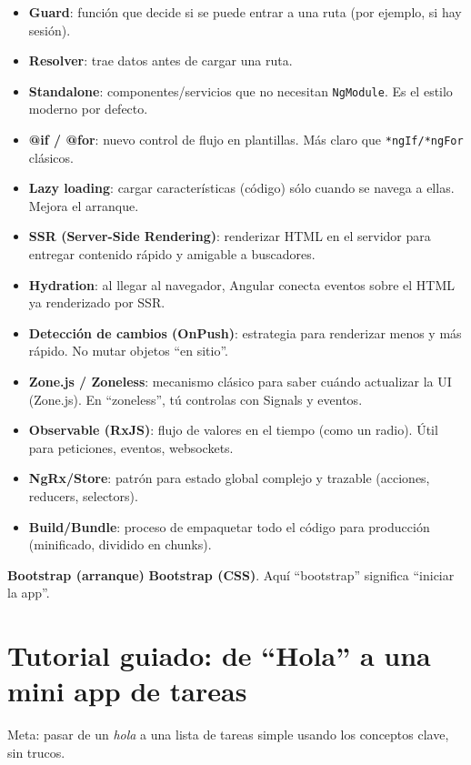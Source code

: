 \documentclass[11pt,a4paper]{article}
\begin{document}
\begin{itemize}[leftmargin=*]
  \item \textbf{Guard}: función que decide si se puede entrar a una ruta (por ejemplo, si hay sesión).
  \item \textbf{Resolver}: trae datos antes de cargar una ruta.
  \item \textbf{Standalone}: componentes/servicios que no necesitan \texttt{NgModule}. Es el estilo moderno por defecto.
  \item \textbf{@if / @for}: nuevo control de flujo en plantillas. Más claro que \texttt{*ngIf/*ngFor} clásicos.
  \item \textbf{Lazy loading}: cargar características (código) sólo cuando se navega a ellas. Mejora el arranque.
  \item \textbf{SSR (Server-Side Rendering)}: renderizar HTML en el servidor para entregar contenido rápido y amigable a buscadores.
  \item \textbf{Hydration}: al llegar al navegador, Angular conecta eventos sobre el HTML ya renderizado por SSR.
  \item \textbf{Detección de cambios (OnPush)}: estrategia para renderizar menos y más rápido. No mutar objetos “en sitio”.
  \item \textbf{Zone.js / Zoneless}: mecanismo clásico para saber cuándo actualizar la UI (Zone.js). En “zoneless”, tú controlas con Signals y eventos.
  \item \textbf{Observable (RxJS)}: flujo de valores en el tiempo (como un radio). Útil para peticiones, eventos, websockets.
  \item \textbf{NgRx/Store}: patrón para estado global complejo y trazable (acciones, reducers, selectors).
  \item \textbf{Build/Bundle}: proceso de empaquetar todo el código para producción (minificado, dividido en chunks).
\end{itemize}

\begin{warnbox}
\textbf{Bootstrap (arranque)} \neq \textbf{Bootstrap (CSS)}. Aquí “bootstrap” significa “iniciar la app”.
\end{warnbox}

\section{Tutorial guiado: de “Hola” a una mini app de tareas}
Meta: pasar de un \emph{hola} a una lista de tareas simple usando los conceptos clave, sin trucos.
\end{document}
